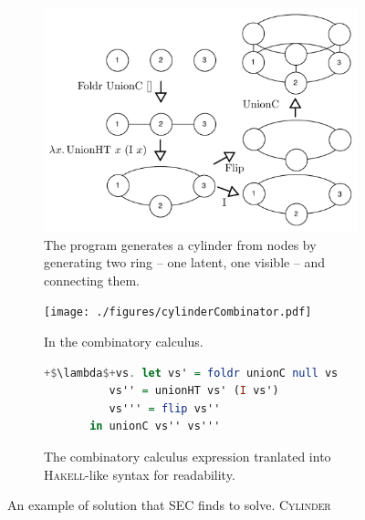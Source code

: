 \documentclass{article} %
\begin{document}
\begin{figure}
\begin{subfigure}[b]{.45\textwidth}
\includegraphics[width=\linewidth]{./figures/cylinder.pdf}
\caption{The program generates a cylinder from nodes by generating two ring -- one latent, one visible -- and connecting them.}
\end{subfigure}
\hspace{0.2in}
\begin{minipage}[b]{.5\textwidth}
\begin{subfigure}[t]{\textwidth}
\texttt{[image: ./figures/cylinderCombinator.pdf]}
\caption{In the combinatory calculus. }
\vspace{.3in}
\end{subfigure}
\begin{subfigure}[b]{\textwidth}
\begin{lstlisting}[language=haskell, basicstyle=\small, escapechar=+]
+$\lambda$+vs. let vs' = foldr unionC null vs
          vs'' = unionHT vs' (I vs')   
          vs''' = flip vs''
       in unionC vs'' vs'''
\end{lstlisting}
\vfill
\caption{The combinatory calculus expression tranlated into \textsc{Hakell}-like syntax for readability.}
\end{subfigure}
\end{minipage}
\caption{An example of solution that SEC finds to solve. \textsc{Cylinder}\label{ref:cylinder}}
\end{figure}
\end{document}
